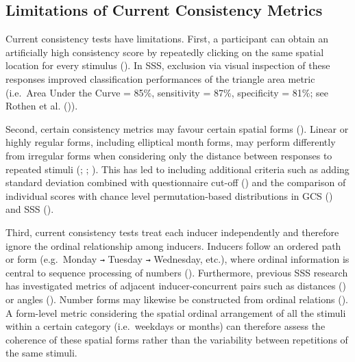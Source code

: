 \documentclass[
  man,
  floatsintext,
  longtable,
  nolmodern,
  notxfonts,
  notimes,
  colorlinks=true,linkcolor=blue,citecolor=blue,urlcolor=blue]{apa7}
\begin{document}
\subsection{Limitations of Current Consistency
Metrics}\label{limitations-of-current-consistency-metrics}

Current consistency tests have limitations. First, a participant can
obtain an artificially high consistency score by repeatedly clicking on
the same spatial location for every stimulus
(). In SSS, exclusion via
visual inspection of these responses improved classification
performances of the triangle area metric (i.e.~Area Under the Curve =
85\%, sensitivity = 87\%, specificity = 81\%; see Rothen et al.
()).

Second, certain consistency metrics may favour certain spatial forms
(). Linear or highly regular
forms, including elliptical month forms, may perform differently from
irregular forms when considering only the distance between responses to
repeated stimuli (;
;
). This has led to including
additional criteria such as adding standard deviation combined with
questionnaire cut-off () and
the comparison of individual scores with chance level permutation-based
distributions in GCS () and
SSS ().

Third, current consistency tests treat each inducer independently and
therefore ignore the ordinal relationship among inducers. Inducers
follow an ordered path or form (e.g.~Monday \texttt{→} Tuesday
\texttt{→} Wednesday, etc.), where ordinal information is central to
sequence processing of numbers (). Furthermore, previous SSS research has investigated
metrics of adjacent inducer-concurrent pairs such as distances
() or angles
(). Number forms may
likewise be constructed from ordinal relations
(). A form-level metric
considering the spatial ordinal arrangement of all the stimuli within a
certain category (i.e.~weekdays or months) can therefore assess the
coherence of these spatial forms rather than the variability between
repetitions of the same stimuli.
\end{document}
